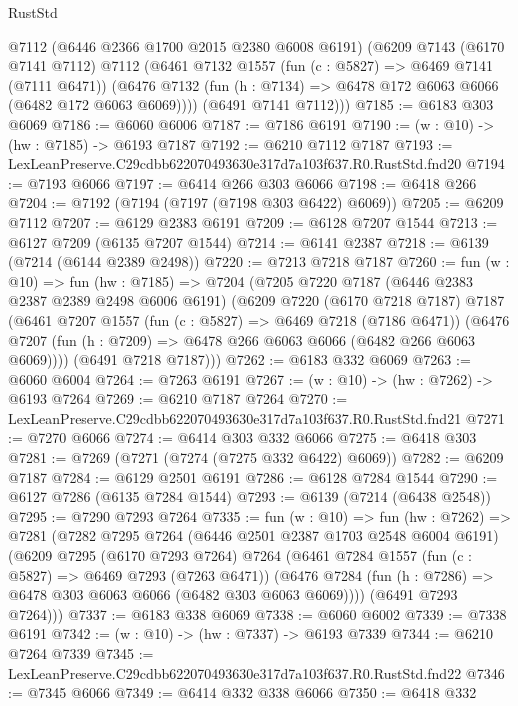 \begin{lexlean}{RustStd}
\begin{coremodule}
      @7112
      (@6446 @2366 @1700 @2015 @2380 @6008 @6191)
      (@6209
        @7143
        (@6170 @7141 @7112)
        @7112
        (@6461
          @7132
          @1557
          (fun (c : @5827) => @6469 @7141 (@7111 @6471))
          (@6476 @7132 (fun (h : @7134) => @6478 @172 @6063 @6066 (@6482 @172 @6063 @6069))))
        (@6491 @7141 @7112)))
@7185 := @6183 @303 @6069
@7186 := @6060 @6006
@7187 := @7186 @6191
@7190 := (w : @10) -> (hw : @7185) -> @6193 @7187
@7192 := @6210 @7112 @7187
@7193 := LexLeanPreserve.C29cdbb622070493630e317d7a103f637.R0.RustStd.fnd20
@7194 := @7193 @6066
@7197 := @6414 @266 @303 @6066
@7198 := @6418 @266
@7204 := @7192 (@7194 (@7197 (@7198 @303 @6422) @6069))
@7205 := @6209 @7112
@7207 := @6129 @2383 @6191
@7209 := @6128 @7207 @1544
@7213 := @6127 @7209 (@6135 @7207 @1544)
@7214 := @6141 @2387
@7218 := @6139 (@7214 (@6144 @2389 @2498))
@7220 := @7213 @7218 @7187
@7260 := fun (w : @10) =>
  fun (hw : @7185) =>
  @7204
    (@7205
      @7220
      @7187
      (@6446 @2383 @2387 @2389 @2498 @6006 @6191)
      (@6209
        @7220
        (@6170 @7218 @7187)
        @7187
        (@6461
          @7207
          @1557
          (fun (c : @5827) => @6469 @7218 (@7186 @6471))
          (@6476 @7207 (fun (h : @7209) => @6478 @266 @6063 @6066 (@6482 @266 @6063 @6069))))
        (@6491 @7218 @7187)))
@7262 := @6183 @332 @6069
@7263 := @6060 @6004
@7264 := @7263 @6191
@7267 := (w : @10) -> (hw : @7262) -> @6193 @7264
@7269 := @6210 @7187 @7264
@7270 := LexLeanPreserve.C29cdbb622070493630e317d7a103f637.R0.RustStd.fnd21
@7271 := @7270 @6066
@7274 := @6414 @303 @332 @6066
@7275 := @6418 @303
@7281 := @7269 (@7271 (@7274 (@7275 @332 @6422) @6069))
@7282 := @6209 @7187
@7284 := @6129 @2501 @6191
@7286 := @6128 @7284 @1544
@7290 := @6127 @7286 (@6135 @7284 @1544)
@7293 := @6139 (@7214 (@6438 @2548))
@7295 := @7290 @7293 @7264
@7335 := fun (w : @10) =>
  fun (hw : @7262) =>
  @7281
    (@7282
      @7295
      @7264
      (@6446 @2501 @2387 @1703 @2548 @6004 @6191)
      (@6209
        @7295
        (@6170 @7293 @7264)
        @7264
        (@6461
          @7284
          @1557
          (fun (c : @5827) => @6469 @7293 (@7263 @6471))
          (@6476 @7284 (fun (h : @7286) => @6478 @303 @6063 @6066 (@6482 @303 @6063 @6069))))
        (@6491 @7293 @7264)))
@7337 := @6183 @338 @6069
@7338 := @6060 @6002
@7339 := @7338 @6191
@7342 := (w : @10) -> (hw : @7337) -> @6193 @7339
@7344 := @6210 @7264 @7339
@7345 := LexLeanPreserve.C29cdbb622070493630e317d7a103f637.R0.RustStd.fnd22
@7346 := @7345 @6066
@7349 := @6414 @332 @338 @6066
@7350 := @6418 @332

\end{coremodule}
\end{lexlean}
